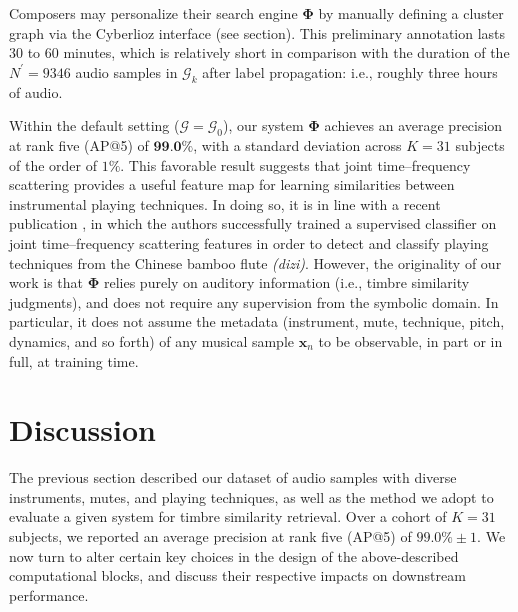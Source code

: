 \documentclass{bmcart}
\newcommand{\lnameref}[1]{%
\bgroup
\let\nmu\MakeLowercase
\nameref{#1}\egroup}
\newcommand{\nmu}{}
\begin{document}
Composers may personalize their search engine $\mathbf{\Phi}$ by manually defining a cluster graph via the Cyberlioz interface (see \lnameref{sec:data-collection} section).
This preliminary annotation lasts $30$ to $60$ minutes, which is relatively short in comparison with the duration of the $N^\prime = 9346$ audio samples in $\mathcal{G}_k$ after label propagation: i.e., roughly three hours of audio.

Within the default setting ($\mathcal{G}=\mathcal{G}_0$), our system $\mathbf{\Phi}$ achieves an average precision at rank five (AP@5) of $\textbf{99.0\%}$, with a standard deviation across $K=31$ subjects of the order of $1\%$.
This favorable result suggests that joint time--frequency scattering provides a useful feature map for learning similarities between instrumental playing techniques.
In doing so, it is in line with a recent publication \cite{wang2020icassp}, in which the authors successfully trained a supervised classifier on joint time--frequency scattering features in order to detect and classify playing techniques from the Chinese bamboo flute \emph{(dizi)}.
However, the originality of our work is that $\mathbf{\Phi}$ relies purely on auditory information (i.e., timbre similarity judgments), and does not require any supervision from the symbolic domain.
In particular, it does not assume the metadata (instrument, mute, technique, pitch, dynamics, and so forth) of any musical sample $\boldsymbol{x}_n$ to be observable, in part or in full, at training time.



\section*{\nmu Discussion}
\label{sec:discussion}

The previous section described our dataset of audio samples with diverse instruments, mutes, and playing techniques, as well as the method we adopt to evaluate a given system for timbre similarity retrieval.
Over a cohort of $K=31$ subjects, we reported an average precision at rank five (AP@5) of $99.0\% \pm 1$.
We now turn to alter certain key choices in the design of the above-described computational blocks, and discuss their respective impacts on downstream performance.
\end{document}

